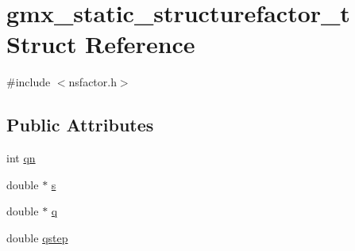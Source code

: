 \hypertarget{structgmx__static__structurefactor__t}{\section{gmx\-\_\-static\-\_\-structurefactor\-\_\-t \-Struct \-Reference}
\label{structgmx__static__structurefactor__t}
}


{\ttfamily \#include $<$nsfactor.\-h$>$}

\subsection*{\-Public \-Attributes}
\begin{DoxyCompactItemize}
\item 
int \hyperlink{structgmx__static__structurefactor__t_a7566e860192c4ded8b690547178b7f75}{qn}
\item 
double $\ast$ \hyperlink{structgmx__static__structurefactor__t_a4da0bf63a2046993db8cbb8e071225d6}{s}
\item 
double $\ast$ \hyperlink{structgmx__static__structurefactor__t_a8b798197d96cd9216730620bc6060cd2}{q}
\item 
double \hyperlink{structgmx__static__structurefactor__t_a968722b199b96c68e1c96aa5d185bbad}{qstep}
\end{DoxyCompactItemize}


